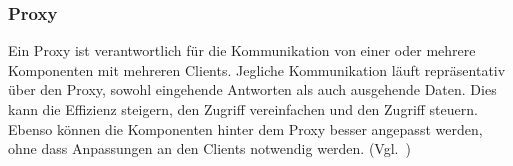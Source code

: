 \subsubsection{Proxy}
Ein Proxy ist verantwortlich für die Kommunikation von einer oder mehrere Komponenten mit mehreren Clients.
Jegliche Kommunikation läuft repräsentativ über den Proxy, sowohl eingehende Antworten als auch ausgehende Daten.
Dies kann die Effizienz steigern, den Zugriff vereinfachen und den Zugriff steuern.
Ebenso können die Komponenten hinter dem Proxy besser angepasst werden, ohne dass Anpassungen an den Clients notwendig werden.
(Vgl.~\cite{buschmann-pattern-oriented-software-architecture})
